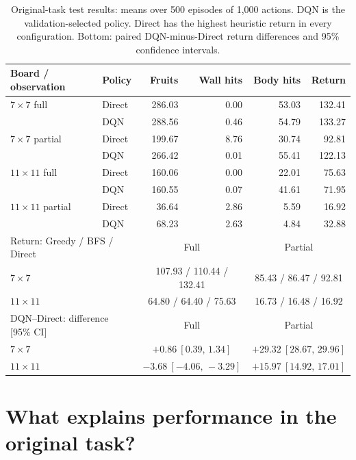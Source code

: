 \documentclass{article}
\begin{document}
\begin{table}[t]
\caption{Original-task test results: means over 500 episodes of 1,000 actions. DQN is the validation-selected policy. Direct has the highest heuristic return in every configuration. Bottom: paired DQN-minus-Direct return differences and 95\% confidence intervals.}
\label{tab:native}
\centering
\begin{small}
\begin{tabular}{llrrrr}
\toprule
Board / observation & Policy & Fruits & Wall hits & Body hits & Return \\
\midrule
$7\times7$ full & Direct & 286.03 & 0.00 & 53.03 & 132.41 \\
 & DQN & 288.56 & 0.46 & 54.79 & 133.27 \\
$7\times7$ partial & Direct & 199.67 & 8.76 & 30.74 & 92.81 \\
 & DQN & 266.42 & 0.01 & 55.41 & 122.13 \\
$11\times11$ full & Direct & 160.06 & 0.00 & 22.01 & 75.63 \\
 & DQN & 160.55 & 0.07 & 41.61 & 71.95 \\
$11\times11$ partial & Direct & 36.64 & 2.86 & 5.59 & 16.92 \\
 & DQN & 68.23 & 2.63 & 4.84 & 32.88 \\
\midrule
\multicolumn{2}{l}{Return: Greedy / BFS / Direct} & \multicolumn{2}{c}{Full} & \multicolumn{2}{c}{Partial} \\
\multicolumn{2}{l}{$7\times7$} & \multicolumn{2}{c}{107.93 / 110.44 / 132.41} & \multicolumn{2}{c}{85.43 / 86.47 / 92.81} \\
\multicolumn{2}{l}{$11\times11$} & \multicolumn{2}{c}{64.80 / 64.40 / 75.63} & \multicolumn{2}{c}{16.73 / 16.48 / 16.92} \\
\midrule
\multicolumn{2}{l}{DQN--Direct: difference [95\% CI]} & \multicolumn{2}{c}{Full} & \multicolumn{2}{c}{Partial} \\
\multicolumn{2}{l}{$7\times7$} & \multicolumn{2}{c}{$+0.86\ [0.39,\,1.34]$} & \multicolumn{2}{c}{$+29.32\ [28.67,\,29.96]$} \\
\multicolumn{2}{l}{$11\times11$} & \multicolumn{2}{c}{$-3.68\ [-4.06,\,-3.29]$} & \multicolumn{2}{c}{$+15.97\ [14.92,\,17.01]$} \\
\bottomrule
\end{tabular}
\end{small}
\end{table}

\newpage
\section{What explains performance in the original task?}
\end{document}
